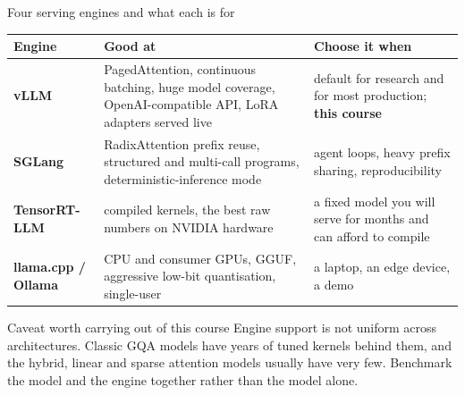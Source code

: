 \documentclass[aspectratio=169,10pt]{beamer}
\begin{document}
\iffalse
\begin{frame}[shrink=19]{Four serving engines and what each is for}
  \centering
  \footnotesize
  \begin{tabular}{@{}L{2.2cm} L{4.4cm} L{4.6cm}@{}}
    \toprule
    \textbf{Engine} & \textbf{Good at} & \textbf{Choose it when}\\
    \midrule
    \textbf{vLLM} & PagedAttention, continuous batching, huge model coverage,
      OpenAI-compatible API, LoRA adapters served live &
      default for research and for most production; \textbf{this course}\\[0.3em]
    \textbf{SGLang} & RadixAttention prefix reuse, structured and multi-call
      programs, deterministic-inference mode &
      agent loops, heavy prefix sharing, reproducibility\\[0.3em]
    \textbf{TensorRT-LLM} & compiled kernels, the best raw numbers on NVIDIA
      hardware &
      a fixed model you will serve for months and can afford to compile\\[0.3em]
    \textbf{llama.cpp / Ollama} & CPU and consumer GPUs, GGUF, aggressive
      low-bit quantisation, single-user &
      a laptop, an edge device, a demo\\
    \bottomrule
  \end{tabular}

  \vspace{0.8em}
  \raggedright
  \begin{block}{Caveat worth carrying out of this course}
    \small
    Engine support is not uniform across architectures. Classic GQA models have
    years of tuned kernels behind them, and the hybrid, linear and sparse
    attention models usually have very few.  Benchmark the model
    and the engine together rather than the model alone.
  \end{block}
\end{frame}
\end{document}

